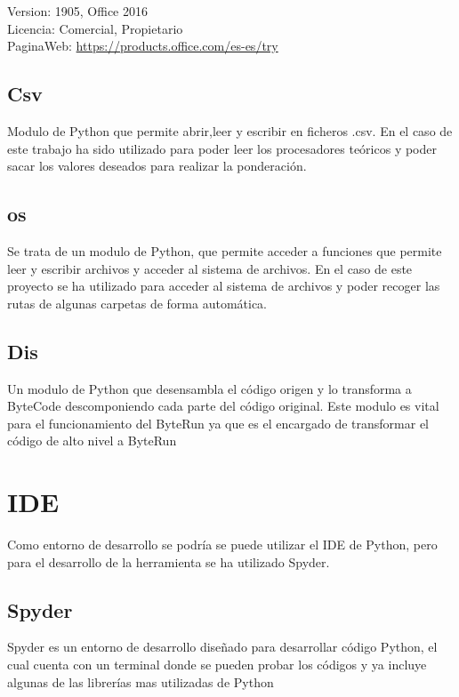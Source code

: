 Version: 1905, Office 2016 \\
Licencia: Comercial, Propietario \\
PaginaWeb: \url{https://products.office.com/es-es/try} \\

\subsection{Csv}

Modulo de Python que permite abrir,leer y escribir en ficheros .csv. En el caso de este trabajo ha sido utilizado para poder leer los procesadores teóricos y poder sacar los valores deseados para realizar la ponderación.
 
\subsection{os}
Se trata de un modulo de Python, que permite acceder a funciones que permite leer y escribir archivos y acceder al sistema de archivos. En el caso de este proyecto se ha utilizado para acceder al sistema de archivos y poder recoger las rutas de algunas carpetas de forma automática. 

\subsection{Dis}
Un modulo de Python que desensambla el código origen y lo transforma a ByteCode descomponiendo cada parte del código original. Este modulo es vital para el funcionamiento del ByteRun ya que es el encargado de transformar el código de alto nivel a ByteRun



\section{IDE}

Como entorno de desarrollo se podría se puede utilizar el IDE de Python, pero para el desarrollo de la herramienta se ha utilizado Spyder.

\subsection{Spyder}
Spyder es un entorno de desarrollo diseñado para desarrollar código Python, el cual cuenta con un terminal donde se pueden probar los códigos y ya incluye algunas de las librerías mas utilizadas de Python\\

